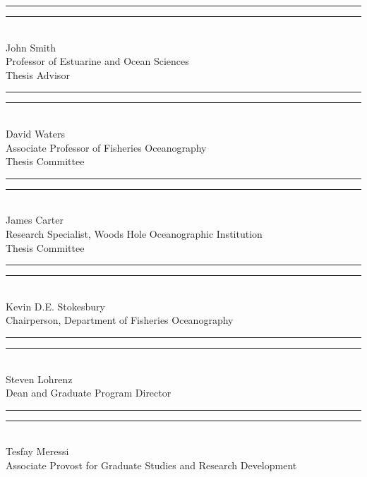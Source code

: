\begin{spacing}{1.1}

\noindent \rule{3.6in}{.2pt} \hspace{0.5in}\rule{1.6in}{.2pt}\\
John Smith\\
Professor of Estuarine and Ocean Sciences\\
Thesis Advisor \vspace{\spacer}  %

\noindent \rule{3.6in}{.2pt} \hspace{.5in}\rule{1.6in}{.2pt}\\
David Waters\\
Associate Professor of Fisheries Oceanography\\
Thesis Committee \vspace{\spacer}

\noindent \rule{3.6in}{.2pt} \hspace{.5in}\rule{1.6in}{.2pt}\\
James Carter\\
Research Specialist, Woods Hole Oceanographic Institution\\
Thesis Committee \vspace{\spacer}

\noindent \rule{3.6in}{.2pt} \hspace{.5in}\rule{1.6in}{.2pt}\\
Kevin D.E. Stokesbury\\
Chairperson, Department of Fisheries Oceanography \vspace{\spacer}


\noindent \rule{3.6in}{.2pt} \hspace{.5in}\rule{1.6in}{.2pt}\\
Steven Lohrenz\\
Dean and Graduate Program Director \vspace{\spacer}

\noindent \rule{3.6in}{.2pt} \hspace{.5in}\rule{1.6in}{.2pt}\\
Tesfay Meressi\\
Associate Provost for Graduate Studies and Research Development
\end{spacing}
\newpage
